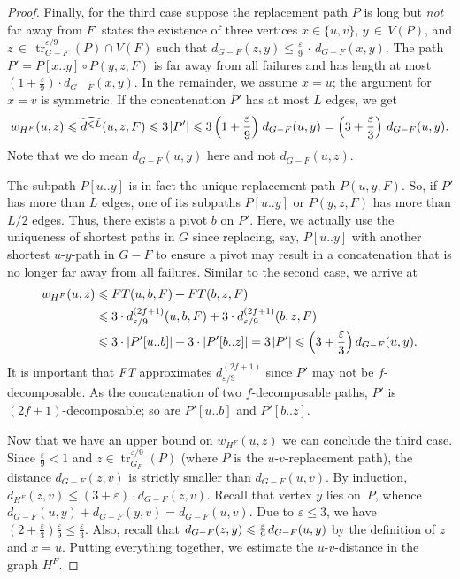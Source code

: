 \documentclass{article}\usepackage[a4paper,margin=20mm]{geometry}
\DeclareMathOperator{\tr}{tr}
\newcommand*{\length}[1]{|#1|}
\newcommand*{\nwspace}{\hspace*{.1em}}
\renewcommand{\le}{\leqslant}
\newcommand{\eps}{\varepsilon}
\begin{document}
\begin{proof}
  Finally, for the third case suppose the replacement path $P$ is long but \emph{not} far away from $F$.
   states the existence of three vertices $x \in \{u,v\}$, $y \,{\in}\, V(P)$,
  and $z \,{\in}\, \tr^{\eps/9}_{G-F}(P) \cap V(F)$
  such that $d_{G-F}(z,y) \le \tfrac{\eps}{9} \,{\cdot}\, d_{G-F}(x,y)$.
  The path $P' = P[x..y] \circ P(y,z,F)$ is far away from all failures
  and has length at most \mbox{$(1+ \tfrac{\eps}{9}) \cdot d_{G-F}(x,y)$}.
%  
  In the remainder, we assume $x=u$; the argument for $x = v$ is symmetric.
  If the concatenation $P'$ has at most $L$ edges, we get
  \begin{equation*}
    w_{H^F}(u,z) \le \widehat{d^{\le L}}(u,z,F) \le 3 \nwspace \length{P'}
      \le 3 \left(1+\frac{\eps}{9}\right) \nwspace d_{G-F}(u,y) = \left(3+\frac{\eps}{3} \right) \, d_{G-F}(u,y).
  \end{equation*}
  Note that we do mean $d_{G-F}(u,y)$ here and not $d_{G-F}(u,z)$.
  
  The subpath $P[u..y]$ is in fact the unique replacement path $P(u,y,F)$.
  So, if $P'$ has more than $L$ edges,
  one of its subpaths $P[u..y]$ or $P(y,z,F)$ has more than $L/2$ edges.
  Thus, there exists a pivot $b$ on $P'$.
  Here, we actually use the uniqueness of shortest paths in $G$
  since replacing, say, $P[u..y]$  with another shortest $u$-$y$-path in $G-F$
  to ensure a pivot
  may result in a concatenation that is no longer far away from all failures.
%  
  Similar to the second case, we arrive at
  \begin{align*}
    w_{H^F}(u,z) &\le FT(u,b,F) + FT(b,z,F)\\
      &\le 3 \cdot d^{(2f+1)}_{\eps/9}(u,b,F)
        +3 \cdot d^{(2f+1)}_{\eps/9}(b,z,F)\\
      &\le 3 \cdot \length{P'[u..b]} + 3 \cdot \length{P'[b..z]}
       = 3 \nwspace \length{P'}
       \le \left(3+\frac{\eps}{3}\right) d_{G-F}(u,y).
  \end{align*}
  It is important that \emph{FT} approximates $d^{(2f+1)}_{\eps/9}$
  since $P'$ may not be \mbox{$f$-decomposable}.
  As the concatenation of two $f$-decomposable paths,
  $P'$ is $(2f{+}1)$-decomposable; so are $P'[u..b]$ and $P'[b..z]$.
  
  Now that we have an upper bound on $w_{H^F}(u,z)$
  we can conclude the third case.
  Since $\tfrac{\eps}{9} < 1$ and $z \in \tr^{\eps/9}_{G_F}(P)$ 
  (where $P$ is the $u$-$v$-replacement path), the distance $d_{G-F}(z,v)$
  is strictly smaller than $d_{G-F}(u,v)$.
  By induction, $d_{H^F}(z,v) \le (3{+}\eps) \cdot d_{G-F}(z,v)$.
  Recall that vertex $y$ lies on~$P$, whence $d_{G-F}(u,y) + d_{G-F}(y,v) = d_{G-F}(u,v)$.
  Due to $\eps \le 3$, we have 
  $(2{+}\tfrac{\eps}{3}) \tfrac{\eps}{9} \le \tfrac{\eps}{3}$.
  Also, recall that $d_{G-F}(z,y) \le \tfrac{\eps}{9} \nwspace d_{G-F}(u,y)$ 
  by the definition of $z$ and $x = u$.
  Putting everything together, we estimate the $u$-$v$-distance in the graph $H^F$.


\end{proof}
\end{document}
